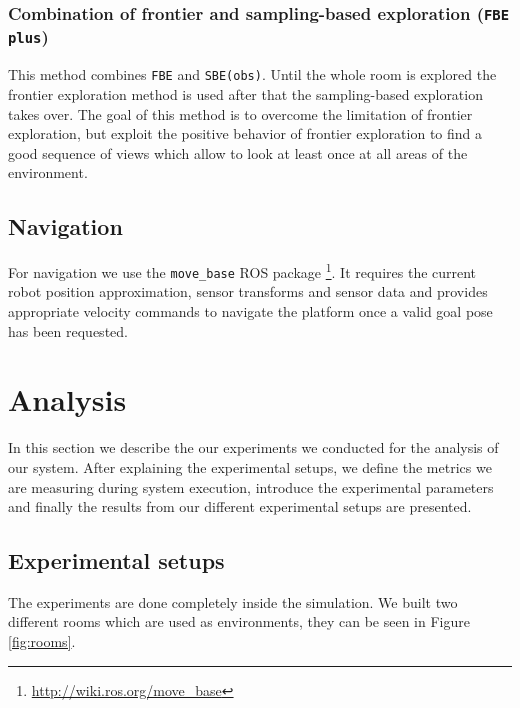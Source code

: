 \documentclass[a4paper,11pt,english]{article}
\begin{document}
\subsubsection{Combination of frontier and sampling-based exploration (\texttt{FBE plus})}
This method combines \texttt{FBE} and \texttt{SBE(obs)}.
Until the whole room is explored the frontier exploration method is used after that the sampling-based exploration takes over. 
The goal of this method is to overcome the limitation of frontier exploration, but exploit the positive behavior of frontier exploration to find a good sequence of views which allow to look at least once at all areas of the environment.

\subsection{Navigation}
For navigation we use the \texttt{move\_base} ROS package \footnote{\url{http://wiki.ros.org/move_base}}.
It requires the current robot position approximation, sensor transforms and sensor data and provides appropriate velocity commands to navigate the platform once a valid goal pose has been requested.

\section{Analysis}
\label{Analysis}
In this section we describe the our experiments we conducted for the analysis of our system.
After explaining the experimental setups, we define the metrics we are measuring during system execution, introduce the experimental parameters and finally the results from our different experimental setups are presented.

\subsection{Experimental setups}
The experiments are done completely inside the simulation.
We built two different rooms which are used as environments, they can be seen in Figure \ref{fig:rooms}.
\end{document}
